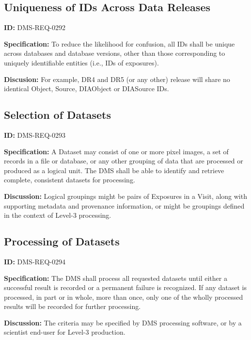 \documentclass[SE,toc,lsstdraft]{lsstdoc}
\begin{document}
\subsection{Uniqueness of IDs Across Data Releases}

\label{DMS-REQ-0292}
\textbf{ID:} DMS-REQ-0292

\textbf{Specification:} To reduce the likelihood for confusion, all IDs shall be unique across databases and database versions, other than those corresponding to uniquely identifiable entities (i.e., IDs of exposures).

\textbf{Discusion:} For example, DR4 and DR5 (or any other) release will share no identical Object, Source, DIAObject or DIASource IDs.







\subsection{Selection of Datasets}

\label{DMS-REQ-0293}
\textbf{ID:} DMS-REQ-0293

\textbf{Specification:} A Dataset may consist of one or more pixel images, a set of records in a file or database, or any other grouping of data that are processed or produced as a logical unit. The DMS shall be able to identify and retrieve complete, consistent datasets for processing.

\textbf{Discussion: }Logical groupings might be pairs of Exposures in a Visit, along with supporting metadata and provenance information, or might be groupings defined in the context of Level-3 processing.




\subsection{Processing of Datasets}

\label{DMS-REQ-0294}
\textbf{ID:} DMS-REQ-0294

\textbf{Specification:} The DMS shall process all requested datasets until either a successful result is recorded or a permanent failure is recognized. If any dataset is processed, in part or in whole, more than once, only one of the wholly processed results will be recorded for further processing.

\textbf{Discussion: }The criteria may be specified by DMS processing software, or by a scientist end-user for Level-3 production.
\end{document}
